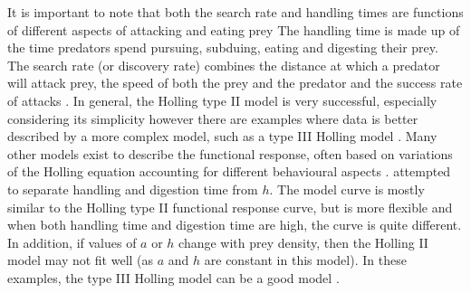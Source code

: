 \documentclass{article}
\begin{document}
It is important to note that both the search rate and handling times are functions of different aspects of attacking and eating prey \cite{Hassel1976TheDeath-Rate} The handling time is made up of the time predators spend pursuing, subduing, eating and digesting their prey. The search rate (or discovery rate) combines the distance at which a predator will attack prey, the speed of both the prey and the predator and the success rate of attacks \cite{Holling1966}. In general, the Holling type II model is very successful, especially considering its simplicity however there are examples where data is better described by a more complex model, such as a type III Holling model \cite{Hassel1976TheDeath-Rate} . 
Many other models exist to describe the functional response, often based on variations of the Holling equation accounting for different behavioural aspects  \cite{Jeschke2002PredatorPrey}. \cite{Jeschke2002PredatorPrey} attempted to separate handling and digestion time from  $h$. The model curve is mostly similar to the Holling type II functional response curve, but is more flexible and when both handling time and digestion time are high, the curve is quite different. In addition, if values of $a$ or $h$ change with prey density, then the Holling II model may not fit well  (as $a$ and $h$ are constant in this model). In these examples, the type III Holling model can be a good model \cite{Hassel1976TheDeath-Rate}. 
\end{document}
